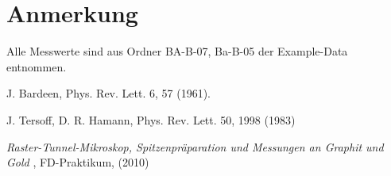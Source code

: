 \documentclass[
	a4paper,
	12pt,
	pagesize,
	ngerman
]{scrartcl}
\begin{document}
\section{Anmerkung}
Alle Messwerte sind aus Ordner BA-B-07, Ba-B-05 der Example-Data entnommen.

\newpage
\begin{thebibliography}{9}
	J. Bardeen, Phys. Rev. Lett. 6, 57 (1961).
	
	J. Tersoff, D. R. Hamann, Phys. Rev. Lett. 50, 1998 (1983)
	
	\textit{Raster-Tunnel-Mikroskop, Spitzenpräparation und Messungen an Graphit und Gold },
	FD-Praktikum, (2010)

\end{thebibliography}
\end{document}

